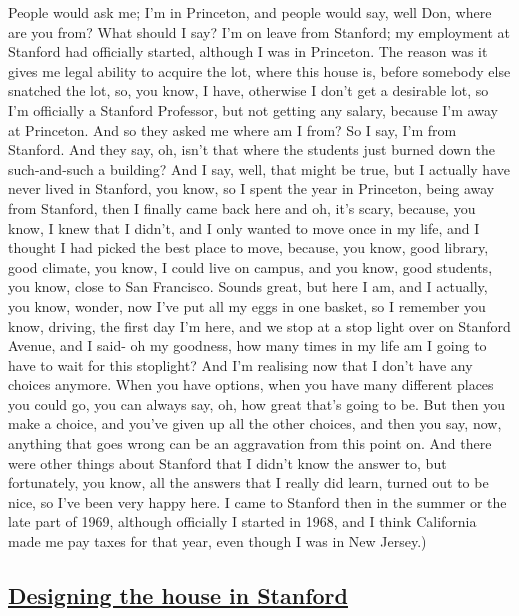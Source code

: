 \documentclass[]{article}
\begin{document}
People would ask me; I'm in Princeton, and people would say, well Don,
where are you from? What should I say? I'm on leave from Stanford; my
employment at Stanford had officially started, although I was in
Princeton. The reason was it gives me legal ability to acquire the lot,
where this house is, before somebody else snatched the lot, so, you
know, I have, otherwise I don't get a desirable lot, so I'm officially a
Stanford Professor, but not getting any salary, because I'm away at
Princeton. And so they asked me where am I from? So I say, I'm from
Stanford. And they say, oh, isn't that where the students just burned
down the such-and-such a building? And I say, well, that might be true,
but I actually have never lived in Stanford, you know, so I spent the
year in Princeton, being away from Stanford, then I finally came back
here and oh, it's scary, because, you know, I knew that I didn't, and I
only wanted to move once in my life, and I thought I had picked the best
place to move, because, you know, good library, good climate, you know,
I could live on campus, and you know, good students, you know, close to
San Francisco. Sounds great, but here I am, and I actually, you know,
wonder, now I've put all my eggs in one basket, so I remember you know,
driving, the first day I'm here, and we stop at a stop light over on
Stanford Avenue, and I said- oh my goodness, how many times in my life
am I going to have to wait for this stoplight? And I'm realising now
that I don't have any choices anymore. When you have options, when you
have many different places you could go, you can always say, oh, how
great that's going to be. But then you make a choice, and you've given
up all the other choices, and then you say, now, anything that goes
wrong can be an aggravation from this point on. And there were other
things about Stanford that I didn't know the answer to, but fortunately,
you know, all the answers that I really did learn, turned out to be
nice, so I've been very happy here. I came to Stanford then in the
summer or the late part of 1969, although officially I started in 1968,
and I think California made me pay taxes for that year, even though I
was in New Jersey.)

\subsection{\texorpdfstring{\href{http://webofstories.com/play/17106}{Designing
the house in
Stanford}}{Designing the house in Stanford}}\label{designing-the-house-in-stanford}
\end{document}

